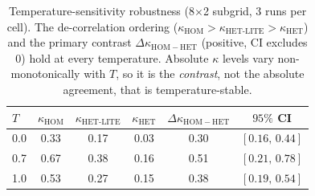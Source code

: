 \begin{table}[t]
\centering
\caption{Temperature-sensitivity robustness (8$\times$2 subgrid, 3 runs per cell). The de-correlation ordering ($\kappa_{\mathrm{HOM}}>\kappa_{\text{HET-LITE}}>\kappa_{\mathrm{HET}}$) and the primary contrast $\Delta\kappa_{\mathrm{HOM-HET}}$ (positive, CI excludes $0$) hold at every temperature. Absolute $\kappa$ levels vary non-monotonically with $T$, so it is the \emph{contrast}, not the absolute agreement, that is temperature-stable.}
\label{tab:tempsweep}
\begin{tabular}{@{}lccccc@{}}
\toprule
$T$ & $\kappa_{\mathrm{HOM}}$ & $\kappa_{\text{HET-LITE}}$ & $\kappa_{\mathrm{HET}}$ & $\Delta\kappa_{\mathrm{HOM-HET}}$ & $95\%$ CI \\
\midrule
0.0 & 0.33 & 0.17 & 0.03 & 0.30 & $[0.16,\,0.44]$ \\
0.7 & 0.67 & 0.38 & 0.16 & 0.51 & $[0.21,\,0.78]$ \\
1.0 & 0.53 & 0.27 & 0.15 & 0.38 & $[0.19,\,0.54]$ \\
\bottomrule
\end{tabular}
\end{table}
